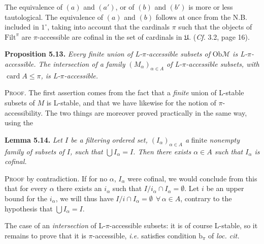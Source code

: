 \documentclass[11pt]{article}
\newcommand{\printedpage}[1]{\marginpar{\footnotesize p.~#1}}
\newcommand{\msp}[1]{\marginpar{\footnotesize [#1]}}
\newcommand{\Filt}{\mathrm{Filt}}
\newcommand{\Ob}{\mathrm{Ob}}
\newcommand{\card}{\operatorname{card}}
\begin{document}
\printedpage{39}

\msp{page 67}
The equivalence of $(a)$ and $(a')$, or of $(b)$ and $(b')$ is more or less tautological. The equivalence of $(a)$ and $(b)$ follows at once from the N.B. included in $1^{\circ}$, taking into account that the cardinals $\pi$ such that the objects of $\Filt^{\pi}$ are $\pi$-accessible are cofinal in the set of cardinals in $\mathfrak{U}$. (\textit{Cf.} 3.2, page 16).

\textbf{Proposition 5.13.} \textit{Every finite union of L-$\pi$-accessible subsets of} $\Ob\mathcal{M}$ \textit{is L-$\pi$-accessible. The intersection of a family $(M_{\alpha})_{\alpha\in A}$ of L-$\pi$-accessible subsets, with} $\card A \leq \pi$\textit{, is L-$\pi$-accessible.}

\textsc{Proof}. The first assertion comes from the fact that a \textit{finite} union of L-stable subsets of $M$ is L-stable, and that we have likewise for the notion of $\pi$-accessibility. The two things are moreover proved practically in the same way, using the

\textbf{Lemma 5.14.} \textit{Let $I$ be a filtering ordered set, $(I_{\alpha})_{\alpha\in A}$ a} finite \textit{nonempty family of subsets of $I$, such that $\bigcup I_{\alpha} = I$. Then there exists $\alpha \in A$ such that $I_{\alpha}$ is cofinal.}

\msp{page 68}
\textsc{Proof} by contradiction. If for no $\alpha$, $I_{\alpha}$ were cofinal, we would conclude from this that for every $\alpha$ there exists an $i_{\alpha}$ such that $I/i_{\alpha} \cap I_{\alpha} = \emptyset$. Let $i$ be an upper bound for the $i_{\alpha}$, we will thus have $I/i \cap I_{\alpha} = \emptyset \ \ \forall\, \alpha \in A$, contrary to the hypothesis that $\bigcup I_{\alpha} = I$.

The case of an \textit{intersection} of L-$\pi$-accessible subsets: it is of course L-stable, so it remains to prove that it is $\pi$-accessible, \textit{i.e.} satisfies condition $\mathrm{b}_{\pi}$ of \textit{loc. cit.}
\end{document}
